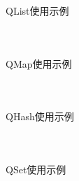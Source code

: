 \documentclass[UTF8,aspectratio=169]{beamer}
\begin{document}
\begin{frame}[fragile]{QList使用示例}
    \begin{columns}
        \begin{column}{0.48\textwidth}
            \inputminted[firstline=1,lastline=19]{cpp}{code/qt_list_example.cpp}
        \end{column}
        \begin{column}{0.48\textwidth}
            \inputminted[firstline=20,lastline=38]{cpp}{code/qt_list_example.cpp}
        \end{column}
    \end{columns}
\end{frame}

\begin{frame}[fragile]{QMap使用示例}
    \begin{columns}
        \begin{column}{0.48\textwidth}
            \inputminted[firstline=1,lastline=19]{cpp}{code/qt_map_example.cpp}
        \end{column}
        \begin{column}{0.48\textwidth}
            \inputminted[firstline=20,lastline=38]{cpp}{code/qt_map_example.cpp}
        \end{column}
    \end{columns}
\end{frame}

\begin{frame}[fragile]{QHash使用示例}
    \begin{columns}
        \begin{column}{0.48\textwidth}
            \inputminted[firstline=1,lastline=19]{cpp}{code/qt_hash_example.cpp}
        \end{column}
        \begin{column}{0.48\textwidth}
            \inputminted[firstline=20,lastline=38]{cpp}{code/qt_hash_example.cpp}
        \end{column}
    \end{columns}
\end{frame}

\begin{frame}[fragile]{QSet使用示例}
    \begin{columns}
        \begin{column}{0.48\textwidth}
            \inputminted[firstline=1,lastline=18]{cpp}{code/qt_set_example.cpp}
        \end{column}
        \begin{column}{0.48\textwidth}
            \inputminted[firstline=19,lastline=35]{cpp}{code/qt_set_example.cpp}
        \end{column}
    \end{columns}
\end{frame}
\end{document}
